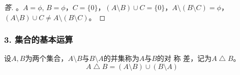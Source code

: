 \documentclass{beamer}
\begin{document}
\begin{CJK*}{UTF8}{gbsn}
\begin{frame}
\begin{Ex}
      
    \end{Ex}
    \pause
    \begin{proof}[答]
      。$A=\phi$, \pause$B=\phi$，\pause$C=\{0\}$，$(A\setminus B)\cup C= \{0\}$，$A\setminus (B\setminus C)=\phi$，  \pause$(A\setminus B)\cup C \neq A\setminus (B\setminus C)$。
    \end{proof}
\end{frame}
\begin{frame}
  \frametitle{3. 集合的基本运算}
\begin{minipage}{0.69\linewidth}
  \begin{Def}
    设$A,B$为两个集合，$A\setminus B$与$B\setminus A$的并集称为$A$与$B$的\alert{对 称 差}，记为$A \bigtriangleup B$。
    \begin{equation*}
      A\bigtriangleup B = (A \setminus B) \cup (B \setminus A)
    \end{equation*}
  \end{Def}\pause
\end{minipage}
\begin{minipage}{0.29\linewidth}
\end{minipage}
\end{frame}
\end{CJK*}
\end{document}
